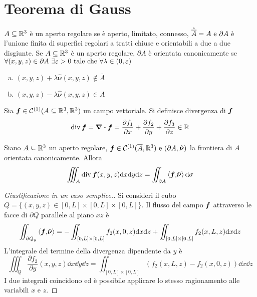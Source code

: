 \section{Teorema di Gauss}

\begin{definition}
	$A\subseteq \mathbb{R}^3$ è un aperto regolare se è aperto, limitato, connesso, $\mathring{\overline A}=A \text{ e } \partial A$ è l'unione finita di superfici regolari a tratti chiuse e orientabili a due a due disgiunte. Se $A \subseteq \mathbb{R}^3$ è un aperto regolare, $\partial A$ è orientata canonicamente se $\forall (x,y,z) \in \partial A \ \exists \varepsilon > 0 \text{ tale che } \forall \lambda \in (0,\varepsilon)$
	\begin{enumerate}[a.]
		\item $(x,y,z) + \lambda \hat{\bm \nu}(x,y,z) \notin \overline{A}$
		\item $(x,y,z) - \lambda \hat{\bm \nu}(x,y,z) \in A$
	\end{enumerate}
\end{definition}

\begin{definition}
	[Divergenza]
	Sia $\bm f \in \mathcal{C}^{(1)}(A\subseteq\mathbb{R}^3,\mathbb{R}^3)$ un campo vettoriale. Si definisce divergenza di $\bm f$
	$$
		\divop \vecf=\divergence \vecf=\frac{\partial f_1}{\partial x} + \frac{\partial f_2}{\partial y} + \frac{\partial f_3}{\partial z} \in \R
	$$
\end{definition}

\begin{theorem}
	Siano $A\subseteq \mathbb{R}^3$ un aperto regolare, $\bm f \in \mathcal{C}^{(1)}(\overline{A},\mathbb{R}^3) \text{ e } (\partial A, \hat{\bm \nu})$ la frontiera di $A$ orientata canonicamente. Allora
	$$
		\iiint_A \divop \vecf(x,y,z)\dd x \dd y \dd z = \iint_{\partial A}\ip{\vecf}{\hat{\bm \nu}}\dd \sigma
	$$
\end{theorem}

\begin{proof}
	[Giustificazione in un caso semplice.]
	Si consideri il cubo $Q=\{(x,y,z)\in[0,L]\times[0,L]\times[0,L]\}$. Il flusso del campo $\bm f$ attraverso le facce di $\partial Q$ parallele al piano $xz$ è
	$$
		\iint_{\partial Q_y}\left\langle\bm f{,}\hat{\bm\nu}\right\rangle=-\iint_{[0,L]\times[0,L]}f_2(x,0,z)\dd x \dd z
		+\iint_{[0,L]\times[0,L]}f_2(x,L,z)\dd x \dd z
	$$
	L'integrale del termine della divergenza dipendente da $y$ è
	$$
		\iiint_{Q}\frac{\partial f_2}{\partial y}(x,y,z)\dd x \dd y \dd z=\iint_{[0,L]\times[0,L]}(f_2(x,L,z)-f_2(x,0,z))\dd x \dd z
	$$
	I due integrali coincidono ed è possibile applicare lo stesso ragionamento alle variabili $x$ e $z$.
\end{proof}

